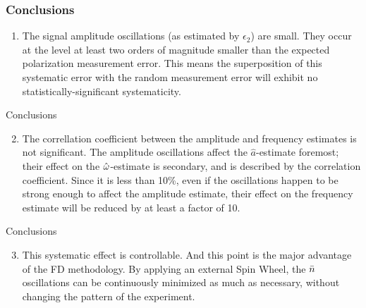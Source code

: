 \documentclass[14pt]{beamer}
\begin{document}
\begin{frame}\frametitle{Conclusions}
	\begin{enumerate}[<+->]
		\item The signal amplitude oscillations (as estimated by $\epsilon_2$) are small.
		They occur at the level at least two orders of magnitude smaller than the expected polarization measurement error. This means the superposition of this systematic error with the random measurement error
		will exhibit no statistically-significant systematicity.
	\end{enumerate}
\end{frame}
\begin{frame}{Conclusions}
	\begin{enumerate}\setcounter{enumi}{1}
		\item The correllation coefficient between the amplitude and frequency estimates is not significant. The amplitude oscillations affect the $\hat a$-estimate foremost; their effect on the $\hat{\omega}$-estimate is secondary, and is described by the correlation coefficient. Since it is less than 10\%, even if the oscillations happen to be
		strong enough to affect the amplitude estimate, their effect on the frequency estimate will be reduced by
		at least a factor of 10.
	\end{enumerate}
\end{frame}
\begin{frame}{Conclusions}
	\begin{enumerate}
		\setcounter{enumi}{2}
		\item This systematic effect is controllable. And this point is the major advantage of the FD methodology.
		By applying an external Spin Wheel, the $\bar n$ oscillations can be continuously minimized
		as much as necessary, without changing the pattern of the experiment.
	\end{enumerate}
\end{frame}
\end{document}
